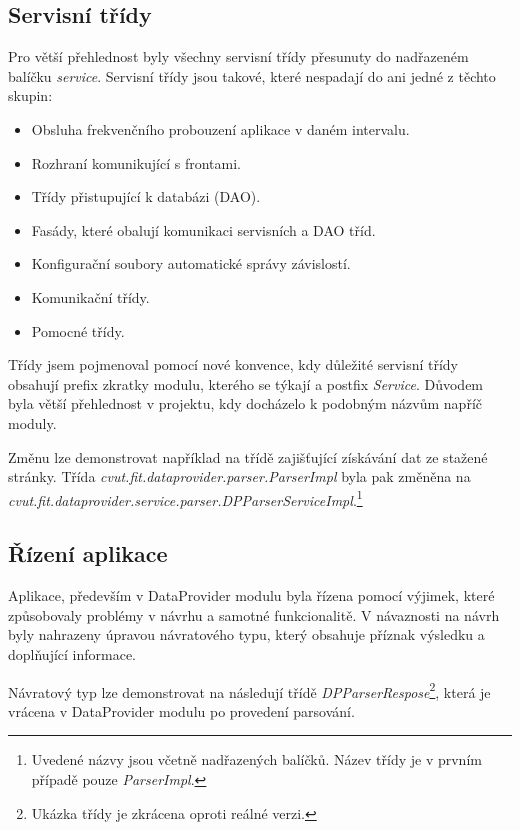 \documentclass[thesis=B,czech]{FITthesis}[2012/06/26]
\begin{document}
\subsection{Servisní třídy}
Pro větší přehlednost byly všechny servisní třídy přesunuty do nadřazeném balíčku \textit{service}. 
Servisní třídy jsou takové, které nespadají do ani jedné z těchto skupin:

\begin{itemize}
\item Obsluha frekvenčního probouzení aplikace v daném intervalu.
\item Rozhraní komunikující s frontami.
\item Třídy přistupující k databázi (DAO).
\item Fasády, které obalují komunikaci servisních a DAO tříd.
\item Konfigurační soubory automatické správy závislostí.
\item Komunikační třídy.
\item Pomocné třídy.
\end{itemize}

Třídy jsem pojmenoval pomocí nové konvence, kdy důležité servisní třídy obsahují prefix zkratky modulu, kterého se týkají
a postfix \textit{Service}. Důvodem byla větší přehlednost v projektu, kdy docházelo k podobným názvům napříč moduly.
\par
Změnu lze demonstrovat například na třídě zajišťující získávání dat ze stažené stránky. Třída \textit{cvut.fit.dataprovider.parser.ParserImpl} byla pak změněna na \textit{cvut.fit.dataprovider.service.parser.DPParserServiceImpl}.\footnote{Uvedené názvy jsou včetně 
nadřazených balíčků. Název třídy je v prvním případě pouze \textit{ParserImpl}.}

\subsection{Řízení aplikace}
Aplikace, především v DataProvider modulu byla řízena pomocí výjimek, které způsobovaly problémy v návrhu a samotné funkcionalitě.
V návaznosti na návrh byly nahrazeny úpravou návratového typu, který obsahuje příznak výsledku 
a doplňující informace.
\par
Návratový typ lze demonstrovat na následují třídě \textit{DPParserRespose}\footnote{Ukázka třídy je zkrácena oproti reálné verzi.}, která je vrácena v DataProvider modulu po provedení parsování.
\end{document}
